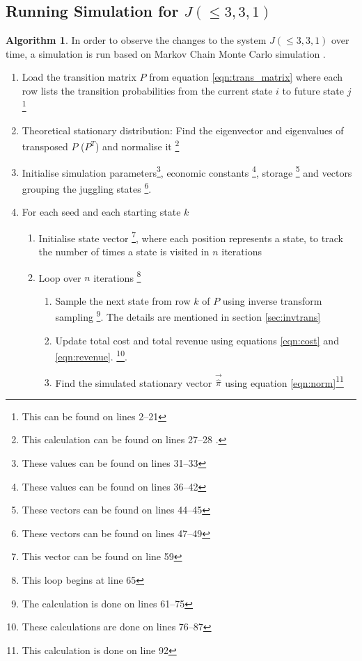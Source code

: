 \documentclass{article}
\theoremstyle{definition}
\newtheorem{algorithm}[theorem]{Algorithm}
\theoremstyle{remark}
\numberwithin{equation}{section}
\begin{document}
\subsection{Running Simulation for $J(\leq 3,3,1)$} \label{sec:runsim}

\begin{algorithm}
In order to observe the changes to the system $J(\leq 3,3,1)$ over time, a simulation is run based on Markov Chain Monte Carlo simulation \cite[p.3]{MCMC}. 
\begin{enumerate}
    \item Load the transition matrix $P$ from equation \ref{eqn:trans_matrix} where each row lists the transition probabilities from the current state $i$ to future state $j$ \footnote{This can be found on lines 2--21 }
    \item Theoretical stationary distribution: Find the eigenvector and eigenvalues of transposed $P$ ($P^T$) and normalise it \footnote{This calculation can be found on lines 27--28 .}
    \item Initialise simulation parameters\footnote{These values can be found on lines 31--33 }, economic constants \footnote{These values can be found on lines 36--42 }, storage \footnote{These vectors can be found on lines 44--45 } and vectors grouping the juggling states \footnote{These vectors can be found on lines 47--49 }.
    \item For each seed and each starting state $k$ 
    \begin{enumerate}
        \item Initialise state vector \footnote{This vector can be found on line 59 }, where each position represents a state, to track the number of times a state is visited in $n$ iterations
        \item Loop over $n$ iterations \footnote{This loop begins at line 65}
        \begin{enumerate}
            \item Sample the next state from row $k$ of $P$ using inverse transform sampling \cite{InvTrans} \footnote{The calculation is done on lines 61--75}. The details are mentioned in section \ref{sec:invtrans}
            \item Update total cost and total revenue using equations \ref{eqn:cost} and \ref{eqn:revenue}. \footnote{These calculations are done on lines 76--87 }.
            \item Find the simulated stationary vector $\vec{\hat{\pi}}$ using  equation \ref{eqn:norm}\footnote{This calculation is done on line 92} 

\end{enumerate}
\end{enumerate}
\end{enumerate}
\end{algorithm}
\end{document}
